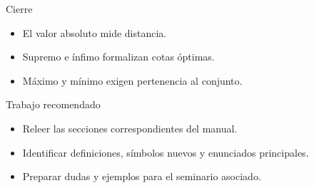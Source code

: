\documentclass[aspectratio=169,11pt]{beamer}
\begin{document}
\begin{frame}{Cierre}
\begin{itemize}
  \item El valor absoluto mide distancia.
  \item Supremo e ínfimo formalizan cotas óptimas.
  \item Máximo y mínimo exigen pertenencia al conjunto.
\end{itemize}
\end{frame}

\begin{frame}{Trabajo recomendado}
\begin{itemize}
  \item Releer las secciones correspondientes del manual.
  \item Identificar definiciones, símbolos nuevos y enunciados principales.
  \item Preparar dudas y ejemplos para el seminario asociado.
\end{itemize}
\end{frame}
\end{document}
